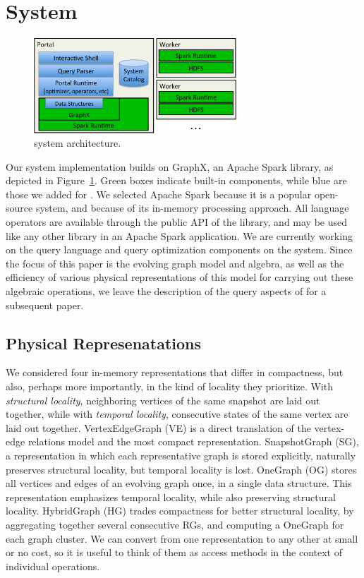 \section{System}
\label{sec:sys}

\begin{figure}[t!]
\begin{center}
\includegraphics[height=1.4in]{figs/architecture.pdf}
\caption{\ql system architecture.}
\label{fig:arch}
\end{center}
\end{figure}

Our \ql system implementation builds on GraphX, an Apache Spark
library, as depicted in Figure~\ref{fig:arch}.  Green boxes indicate
built-in components, while blue are those we added for \ql.  We
selected Apache Spark because it is a popular open-source system, and
because of its in-memory processing approach.  All language operators
are available through the public API of the \ql library, and may be
used like any other library in an Apache Spark application.  We are
currently working on the query language and query optimization
components on the system.  Since the focus of this paper is the
evolving graph model and algebra, as well as the efficiency of various
physical representations of this model for carrying out these
algebraic operations, we leave the description of the query aspects of
\ql for a subsequent paper.

\subsection{Physical Represenatations}
\label{sec:sys:datastructs}

We considered four in-memory \tg representations that differ in
compactness, but also, perhaps more importantly, in the kind of
locality they prioritize. With {\em structural locality}, neighboring
vertices of the same snapshot are laid out together, while with {\em
  temporal locality}, consecutive states of the same vertex are laid
out together.  VertexEdgeGraph (VE) is a direct translation of the
vertex-edge relations model and the most compact representation.
SnapshotGraph (SG), a representation in which each representative
graph is stored explicitly, naturally preserves structural locality,
but temporal locality is lost. OneGraph (OG) stores all vertices and
edges of an evolving graph once, in a single data structure.  This
representation emphasizes temporal locality, while also preserving
structural locality.  HybridGraph (HG) trades compactness for better
structural locality, by aggregating together several consecutive RGs,
and computing a OneGraph for each graph cluster.  We can convert from
one representation to any other at small or no cost, so it is useful
to think of them as access methods in the context of individual
operations.

